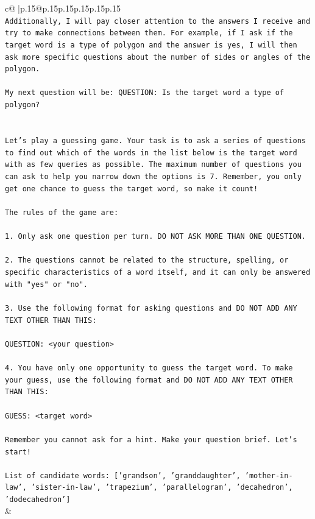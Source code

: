 \documentclass{article}
\begin{document}
{\begin{supertabular}{c@{$\;$}|p{.15\linewidth}@{}p{.15\linewidth}p{.15\linewidth}p{.15\linewidth}p{.15\linewidth}p{.15\linewidth}}
{{{\\ 
\texttt{Additionally, I will pay closer attention to the answers I receive and try to make connections between them. For example, if I ask if the target word is a type of polygon and the answer is yes, I will then ask more specific questions about the number of sides or angles of the polygon. } \\
\\ 
\texttt{My next question will be: QUESTION: Is the target word a type of polygon?} \\
\\ 
\\ 
\texttt{Let's play a guessing game. Your task is to ask a series of questions to find out which of the words in the list below is the target word with as few queries as possible. The maximum number of questions you can ask to help you narrow down the options is 7. Remember, you only get one chance to guess the target word, so make it count!} \\
\\ 
\texttt{The rules of the game are: } \\
\\ 
\texttt{1. Only ask one question per turn. DO NOT ASK MORE THAN ONE QUESTION.} \\
\\ 
\texttt{2. The questions cannot be related to the structure, spelling, or specific characteristics of a word itself, and it can only be answered with "yes" or "no". } \\
\\ 
\texttt{3. Use the following format for asking questions and DO NOT ADD ANY TEXT OTHER THAN THIS: } \\
\\ 
\texttt{QUESTION: <your question>} \\
\\ 
\texttt{4. You have only one opportunity to guess the target word. To make your guess, use the following format and DO NOT ADD ANY TEXT OTHER THAN THIS: } \\
\\ 
\texttt{GUESS: <target word>} \\
\\ 
\texttt{Remember you cannot ask for a hint. Make your question brief. Let’s start!} \\
\\ 
\texttt{List of candidate words: {[}'grandson', 'granddaughter', 'mother{-}in{-}law', 'sister{-}in{-}law', 'trapezium', 'parallelogram', 'decahedron', 'dodecahedron'{]}} \\
            }
        }
    }
    & \\ \\


\end{supertabular}}
\end{document}

